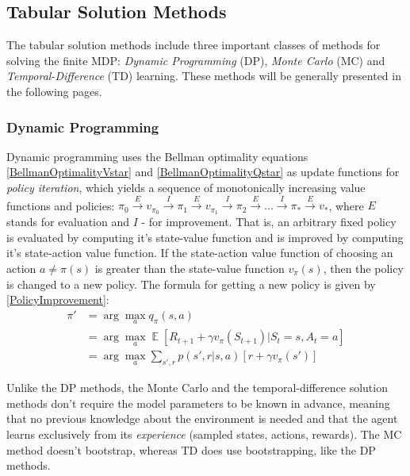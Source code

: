 \subsection{Tabular Solution Methods}
The tabular solution methods include three important classes of methods for solving the finite MDP: \textit{Dynamic Programming} (DP), \textit{Monte Carlo} (MC) and \textit{Temporal-Difference} (TD) learning. These methods will be generally presented in the following pages.

\subsubsection{Dynamic Programming}
Dynamic programming uses the Bellman optimality equations \ref{BellmanOptimalityVstar} and \ref{BellmanOptimalityQstar} as update functions for \textit{policy iteration}, which yields a sequence of monotonically increasing value functions and policies: ${\pi}_{0}\overset{E}{\rightarrow}v_{{\pi}_{0}}\overset{I}{\rightarrow}{\pi}_{1}\overset{E}{\rightarrow}v_{{\pi}_{1}}\overset{I}{\rightarrow}{\pi}_{2}\overset{E}{\rightarrow}...\overset{I}{\rightarrow}{\pi}_{*}\overset{E}{\rightarrow}v_{*}$, where $E$ stands for evaluation and $I$ - for improvement. That is, an arbitrary fixed policy is evaluated by computing it's state-value function and is improved by computing it's state-action value function. If the state-action value function of choosing an action $a \neq \pi(s)$ is greater than the state-value function $v_{\pi}(s)$, then the policy is changed to a new policy. The formula for getting a new policy is given by \ref{PolicyImprovement}:
\begin{equation}\label{PolicyImprovement}
\begin{split}
\pi'&=\arg\!\max_{a}q_{\pi}(s,a)\\
&=\arg\!\max_{a}\mathop{{}\mathbb{E}}\left [ R_{t+1} + \gamma v_{\pi}(S_{t+1})|S_{t}=s, A_{t}=a  \right ] \\
&=\arg\!\max_{a}\sum_{s',r}p(s',r|s,a)\left [ r+\gamma v_{\pi}(s') \right ]
\end{split}
\end{equation}

Unlike the DP methods, the Monte Carlo and the temporal-difference solution methods don't require the model parameters to be known in advance, meaning that no previous knowledge about the environment is needed and that the agent learns exclusively from its \textit{experience} (sampled states, actions, rewards). The MC method doesn't bootstrap, whereas TD does use bootstrapping, like the DP methods.

